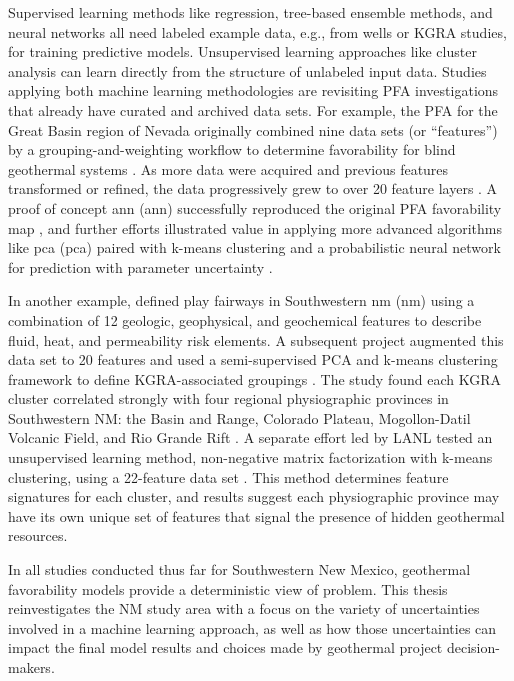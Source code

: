 Supervised learning methods like regression, tree-based ensemble methods, and neural networks all need labeled example data, e.g., from wells or KGRA studies, for training predictive models. Unsupervised learning approaches like cluster analysis can learn directly from the structure of unlabeled input data. Studies applying both machine learning methodologies are revisiting PFA investigations that already have curated and archived data sets. For example, the PFA for the Great Basin region of Nevada originally combined nine data sets (or ``features”) by a grouping-and-weighting workflow to determine favorability for blind geothermal systems \citep{faulds_progress_2017}. As more data were acquired and previous features transformed or refined, the data progressively grew to over 20 feature layers \citep{brown_machine_2020, faulds_discovering_2019}. A proof of concept \acrlong{ann} (\acrshort{ann}) successfully reproduced the original PFA favorability map \citep{brown_machine_2020}, and further efforts illustrated value in applying more advanced algorithms like \acrlong{pca} (\acrshort{pca}) paired with k-means clustering \citep{smith_characterizing_2021} and a probabilistic neural network for prediction with parameter uncertainty \citep{brown_personal_2021}.

In another example, \citet{bielicki_hydrogeolgic_2015} defined play fairways in Southwestern \acrlong{nm} (\acrshort{nm}) using a combination of 12 geologic, geophysical, and geochemical features to describe fluid, heat, and permeability risk elements. A subsequent project augmented this data set to 20 features and used a semi-supervised PCA and k-means clustering framework to define KGRA-associated groupings \citep{pepin_new_2019}. The study found each KGRA cluster correlated strongly with four regional physiographic provinces in Southwestern NM: the Basin and Range, Colorado Plateau, Mogollon-Datil Volcanic Field, and Rio Grande Rift \citep{pepin_new_2019}. A separate effort led by LANL tested an unsupervised learning method, non-negative matrix factorization with k-means clustering, using a 22-feature data set \citep{vesselinov_discovering_2020}. This method determines feature signatures for each cluster, and results suggest each physiographic province may have its own unique set of features that signal the presence of hidden geothermal resources. 

In all studies conducted thus far for Southwestern New Mexico, geothermal favorability models provide a deterministic view of problem. This thesis reinvestigates the NM study area with a focus on the variety of uncertainties involved in a machine learning approach, as well as how those uncertainties can impact the final model results and choices made by geothermal project decision-makers.

